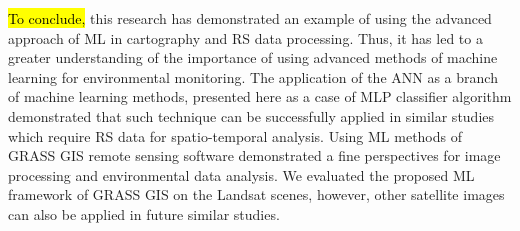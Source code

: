 \documentclass[water,article,submit,pdftex,moreauthors]{Definitions/mdpi}
\begin{document}
\hl{To conclude, }this research has demonstrated an example of using the advanced approach of ML in cartography and RS data processing. Thus, it has led to a greater understanding of the importance of using advanced methods of machine learning for environmental monitoring. The application of the ANN as a branch of machine learning methods, presented here as a case of MLP classifier algorithm demonstrated that such technique can be successfully applied in similar studies which require RS data for spatio-temporal analysis. Using ML methods of GRASS GIS remote sensing software demonstrated a fine perspectives for image processing and environmental data analysis. We evaluated the proposed ML framework of GRASS GIS on the Landsat scenes, however, other satellite images can also be applied in future similar studies.





\end{document}
